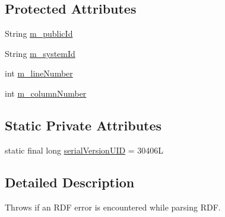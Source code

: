 \subsection*{Protected Attributes}
\begin{DoxyCompactItemize}
\item 
String \hyperlink{classorg_1_1semanticweb_1_1owlapi_1_1rdf_1_1syntax_1_1_r_d_f_parser_exception_a64328fdd4bc82441a981ec1cdae9f2b1}{m\-\_\-public\-Id}
\item 
String \hyperlink{classorg_1_1semanticweb_1_1owlapi_1_1rdf_1_1syntax_1_1_r_d_f_parser_exception_a0e1ccbb7e9ee638afdacf521ac7d1866}{m\-\_\-system\-Id}
\item 
int \hyperlink{classorg_1_1semanticweb_1_1owlapi_1_1rdf_1_1syntax_1_1_r_d_f_parser_exception_a68d2233614454cf6bd7bf7bbd6af4c20}{m\-\_\-line\-Number}
\item 
int \hyperlink{classorg_1_1semanticweb_1_1owlapi_1_1rdf_1_1syntax_1_1_r_d_f_parser_exception_a217ba0ad446bba84116fe9483d3207fd}{m\-\_\-column\-Number}
\end{DoxyCompactItemize}
\subsection*{Static Private Attributes}
\begin{DoxyCompactItemize}
\item 
static final long \hyperlink{classorg_1_1semanticweb_1_1owlapi_1_1rdf_1_1syntax_1_1_r_d_f_parser_exception_a61debbe652c755e4ddcf70e78db82dd2}{serial\-Version\-U\-I\-D} = 30406\-L
\end{DoxyCompactItemize}


\subsection{Detailed Description}
Throws if an R\-D\-F error is encountered while parsing R\-D\-F. 


